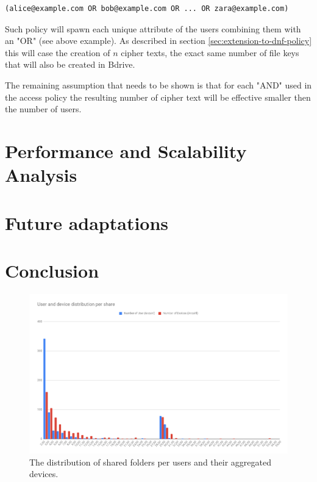 \begin{center}
\begin{lstlisting}[caption={Worst case access policy. The used email address is a unique attribute per user.},captionpos=b]
(alice@example.com OR bob@example.com OR ... OR zara@example.com)
\end{lstlisting}
\end{center}

Such policy will spawn each unique attribute of the users combining them with an "OR" (see above example). As described in section \ref{sec:extension-to-dnf-policy} this will case the creation of $n$ cipher texts, the exact same number of file keys that will also be created in Bdrive. 

The remaining assumption that needs to be shown is that for each "AND" used in the access policy the resulting number of cipher text will be effective smaller then the number of users. 

\section{Performance and Scalability Analysis}


\section{Future adaptations}


\section{Conclusion}
\begin{figure}[!t]
\centering
    \includegraphics[width=1.0\linewidth]{img/share_distribution_bdirve.png}
    \caption{The distribution of shared folders per users and their aggregated devices.}
    \label{fig:evaluation-share-distribution}
\end{figure}
